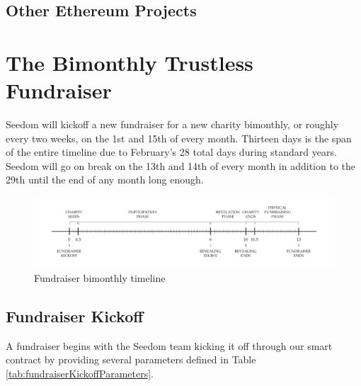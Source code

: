 \documentclass[11pt]{article}
\begin{document}
\subsection{Other Ethereum Projects}



\section{The Bimonthly Trustless Fundraiser}

Seedom will kickoff a new fundraiser for a new charity bimonthly, or roughly every two weeks, on the 1st and 15th of every month. Thirteen days is the span of the entire timeline due to February's 28 total days during standard years. Seedom will go on break on the 13th and 14th of every month in addition to the 29th until the end of any month long enough.

\begin{figure}[H]
\begin{center}
\includegraphics[width=1.0\textwidth]{fundraiserBimonthlyTimeline.pdf}
\caption{Fundraiser bimonthly timeline}
\label{figure:fundraiserBimonthlyTimeline}
\end{center}
\end{figure}

\subsection{Fundraiser Kickoff}
A fundraiser begins with the Seedom team kicking it off through our smart contract by providing several parameters defined in Table \ref{tab:fundraiserKickoffParameters}.
\end{document}
